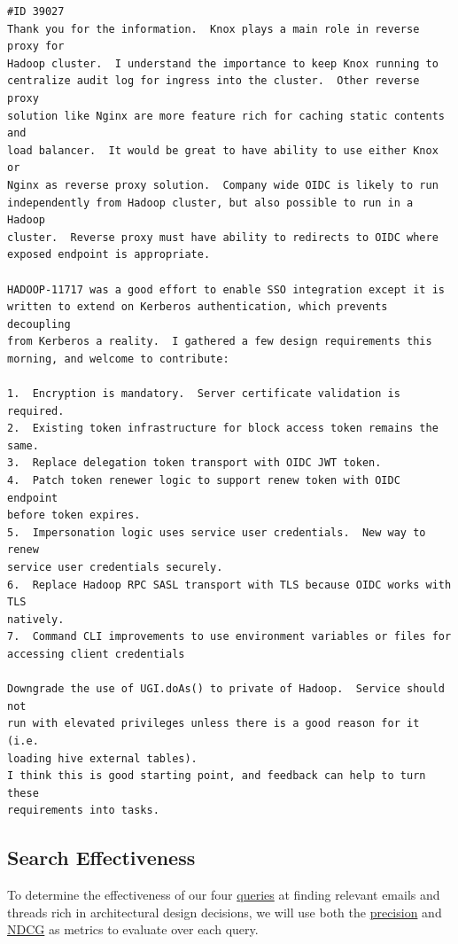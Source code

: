 \documentclass[a4paper, 12pt]{article}
\begin{document}
			\begin{verbatim}
#ID 39027
Thank you for the information.  Knox plays a main role in reverse proxy for
Hadoop cluster.  I understand the importance to keep Knox running to
centralize audit log for ingress into the cluster.  Other reverse proxy
solution like Nginx are more feature rich for caching static contents and
load balancer.  It would be great to have ability to use either Knox or
Nginx as reverse proxy solution.  Company wide OIDC is likely to run
independently from Hadoop cluster, but also possible to run in a Hadoop
cluster.  Reverse proxy must have ability to redirects to OIDC where
exposed endpoint is appropriate.

HADOOP-11717 was a good effort to enable SSO integration except it is
written to extend on Kerberos authentication, which prevents decoupling
from Kerberos a reality.  I gathered a few design requirements this
morning, and welcome to contribute:

1.  Encryption is mandatory.  Server certificate validation is required.
2.  Existing token infrastructure for block access token remains the same.
3.  Replace delegation token transport with OIDC JWT token.
4.  Patch token renewer logic to support renew token with OIDC endpoint
before token expires.
5.  Impersonation logic uses service user credentials.  New way to renew
service user credentials securely.
6.  Replace Hadoop RPC SASL transport with TLS because OIDC works with TLS
natively.
7.  Command CLI improvements to use environment variables or files for
accessing client credentials

Downgrade the use of UGI.doAs() to private of Hadoop.  Service should not
run with elevated privileges unless there is a good reason for it (i.e.
loading hive external tables).
I think this is good starting point, and feedback can help to turn these
requirements into tasks.
			\end{verbatim}
	
	\newpage
	\subsection{Search Effectiveness}
		To determine the effectiveness of our four \hyperref[sec:queries]{queries} at finding relevant emails and threads rich in architectural design decisions, we will use both the \hyperref[eqn:precision]{precision} and \hyperref[eqn:ndcg]{NDCG} as metrics to evaluate over each query.
		
\end{document}
